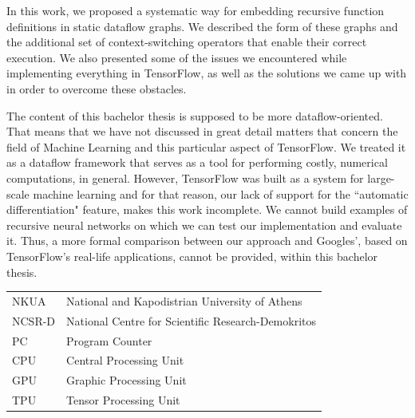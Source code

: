 \documentclass[ack,preface]{dithesis}
\begin{document}
In this work,  we proposed a systematic way for embedding recursive function definitions in static dataflow graphs. We described the form of these graphs and the additional set of context-switching operators that enable their correct execution. We also presented some of the issues we encountered while implementing everything in TensorFlow, as well as the solutions we came up with in order to overcome these obstacles.

The content of this bachelor thesis is supposed to be more dataflow-oriented. That means that we have not discussed in great detail matters that concern the field of  Machine Learning and this particular aspect of TensorFlow. We treated it as a dataflow framework that serves as a tool for performing  costly, numerical computations, in general. However, TensorFlow was  built as a system for large-scale machine learning and for that reason, our lack of support for the ``automatic differentiation" feature, makes this work incomplete. We cannot build examples of recursive neural networks on which we can test our implementation and evaluate it.  Thus, a more formal comparison between our approach and Googles', based on TensorFlow's real-life applications, cannot be provided, within this bachelor thesis.


\backmatter

\abbreviations
\begin{center}
	\begin{tabularx}{\textwidth}{|p{3cm}|p{12.615cm}|}
	\hline
	NKUA    & National and Kapodistrian University of Athens\\
	NCSR-D & National Centre for Scientific Research-Demokritos \\
	PC & Program Counter \\
	CPU & Central Processing Unit\\
	GPU & Graphic Processing Unit\\
	TPU & Tensor Processing Unit\\
	\hline
	\end{tabularx}
\end{center}
\end{document}
